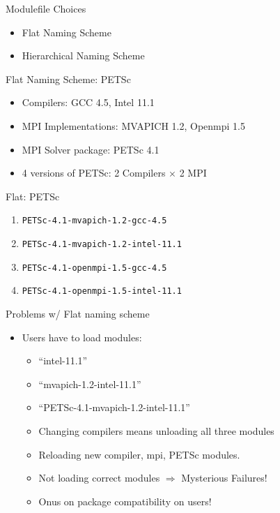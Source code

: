 \documentclass{beamer}
\begin{document}
\begin{frame}{Modulefile Choices}
  \begin{itemize}
    \item Flat Naming Scheme
    \item Hierarchical Naming Scheme
  \end{itemize}
\end{frame}

\begin{frame}{Flat Naming Scheme: PETSc}
  \begin{itemize}
    \item Compilers: GCC 4.5, Intel 11.1
    \item MPI Implementations: MVAPICH 1.2, Openmpi 1.5
    \item MPI Solver package: PETSc 4.1
    \item 4 versions of PETSc: 2 Compilers $\times$ 2 MPI 
  \end{itemize}
\end{frame}

\begin{frame}{Flat: PETSc }
  \begin{enumerate}
  \item \texttt{PETSc-4.1-mvapich-1.2-gcc-4.5}
  \item \texttt{PETSc-4.1-mvapich-1.2-intel-11.1}
  \item \texttt{PETSc-4.1-openmpi-1.5-gcc-4.5}
  \item \texttt{PETSc-4.1-openmpi-1.5-intel-11.1}
  \end{enumerate}
\end{frame}

\begin{frame}{Problems w/ Flat naming scheme}
  \begin{itemize}
    \item Users have to load modules:
      \begin{itemize}
        \item ``intel-11.1''
        \item ``mvapich-1.2-intel-11.1''
        \item ``PETSc-4.1-mvapich-1.2-intel-11.1''
        \item Changing compilers means unloading all three modules
        \item Reloading new compiler, mpi, PETSc modules.
        \item Not loading correct modules $\Rightarrow$ Mysterious Failures!
        \item Onus on package compatibility on users! 
      \end{itemize}
  \end{itemize}
\end{frame}
\end{document}
